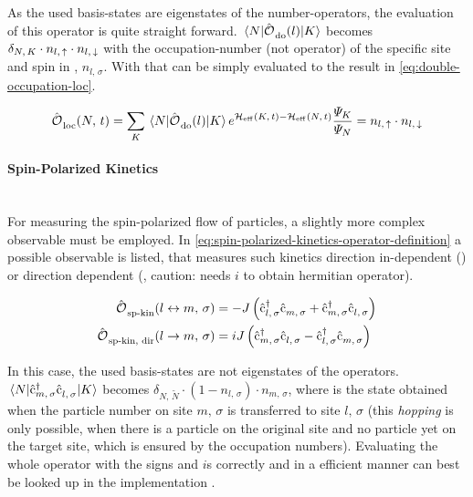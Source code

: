 As the used basis-states are eigenstates of the number-operators, the evaluation of this operator is quite straight forward. 
$\bracketHelper{N}{\doubleOccupationOperator{l}}{K}$ becomes $\delta_{N,\,K}\cdot n_{l,\,\uparrow}\cdot n_{l,\,\downarrow}$ with the occupation-number (not operator) of the specific site and spin in \braN, $n_{l,\,\sigma}$. 
With that  can be simply evaluated to the result in \autoref{eq:double-occupation-loc}.

\begin{equation}
    \label{eq:double-occupation-loc}
    \localObservable{N}{t} = \lsum[K] \bracketHelper{N}{\doubleOccupationOperator{l}}{K} e^{\HeffOft[K]-\HeffOft[N]}
    \frac{
        \psiN[K]
    }{
        \psiN[N]
    } = n_{l,\,\up}\cdot n_{l,\,\down}
\end{equation}

\paragraph*{Spin-Polarized Kinetics}\makebox{}\\

For measuring the spin-polarized flow of particles, a slightly more complex observable must be employed. 
In \autoref{eq:spin-polarized-kinetics-operator-definition} a possible observable is listed, that measures such kinetics direction in-dependent () or direction dependent (, caution: needs $i$ to obtain hermitian operator).

\begin{equation}
    \label{eq:spin-polarized-kinetics-operator-definition}
    \begin{split}
        {\ensuremath{\hat{\text{$\mathcal{O}$}}^{ }_{}}}_\text{sp-kin}(l \leftrightarrow m,\,\sigma) &= - J \left(\hat{\text{c}}^{\dagger }_{l,\,\sigma}\hat{\text{c}}^{ }_{m,\,\sigma} + \hat{\text{c}}^{\dagger }_{m,\,\sigma}\hat{\text{c}}^{ }_{l,\,\sigma}\right)\\
        {\hat{\text{$\mathcal{O}$}}^{ }_{}}_\text{sp-kin, dir}(l \rightarrow m,\,\sigma) &= i J \left(\hat{\text{c}}^{\dagger }_{m,\,\sigma}\hat{\text{c}}^{ }_{l,\,\sigma} - \hat{\text{c}}^{\dagger }_{l,\,\sigma}\hat{\text{c}}^{ }_{m,\,\sigma}\right)\\
    \end{split}
\end{equation}

In this case, the used basis-states are not eigenstates of the operators. 
$\bracketHelper{N}{\withspinop{m}{\sigma}{\dagger}\withspinop{l}{\sigma}{}}{K}$ becomes $\delta_{N,\,\tilde{N}}\cdot (1-n_{l,\,\sigma} )\cdot n_{m,\,\sigma}$, where  is the state obtained when the particle number on site $m,\, \sigma$ is transferred to site $l,\, \sigma$ (this \emph{hopping} is only possible, when there is a particle on the original site and no particle yet on the target site, which is ensured by the occupation numbers).
Evaluating the whole operator with the signs and $i$s correctly and in a efficient manner can best be looked up in the implementation .


